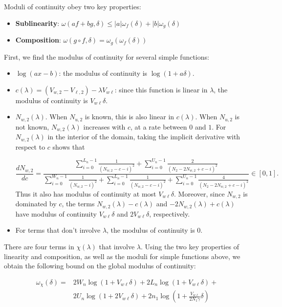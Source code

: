 \documentclass[runningheads]{llncs}
\begin{document}
Moduli of continuity obey two key properties:

\begin{itemize}
\item \textbf{Sublinearity}: $\omega(a f + b g, \delta) \le \lvert a \rvert \omega_f(\delta) + \lvert b \rvert \omega_g (\delta)$
\item \textbf{Composition}: $\omega(g \circ f, \delta) = \omega_g(\omega_f(\delta))$
\end{itemize}

\noindent First, we find the modulus of continuity for several simple functions:

\begin{itemize}
\item $\log(ax - b)$: the modulus of continuity is $\log(1 + a\delta)$.
\item $c(\lambda) = (V_{w,2}-V_{\ell,2}) - \lambda V_{w\ell}$: since this function is linear in $\lambda$, the modulus of continuity is $V_{w\ell}\delta$.
\item $N_{w,2}(\lambda)$. When $N_{u,2}$ is known, this is also linear in $c(\lambda)$. 
When $N_{u,2}$ is not known, $N_{w,2}(\lambda)$ increases with $c$, at a rate between $0$ and $1$.
For $N_{w,2}(\lambda)$ in the interior of the domain, taking the implicit derivative with respect to $c$ shows that

$$\frac{d N_{w, 2}}{dc} = \frac{ \sum_{i=0}^{L_n-1} \frac{1}{(N_{w,2} - c - i)^2} + \sum_{i=0}^{U_n-1} \frac{2}{(N_2 - 2N_{w,2} + c - i)^2} }{\sum_{i=0}^{W_n-1} \frac{1}{(N_{w,2} - i)^2} + \sum_{i=0}^{L_n-1} \frac{1}{(N_{w,2} - c - i)^2} + \sum_{i=0}^{U_n-1} \frac{4}{(N_2 - 2N_{w,2} + c - i)^2} } \in [0, 1].$$
Thus it also has modulus of continuity at most $V_{w\ell}\delta$.
Moreover, since $N_{w,2}$ is dominated by $c$, the terms $N_{w,2}(\lambda)-c(\lambda)$ and $-2N_{w,2}(\lambda)+c(\lambda)$ have modulus of continuity $V_{w\ell}\delta$ and $2V_{w\ell}\delta$, respectively.

\item For terms that don't involve $\lambda$, the modulus of continuity is 0.
\end{itemize}

There are four terms in $\chi(\lambda)$ that involve $\lambda$.
Using the two key properties of linearity and composition, as well as the moduli for simple functions above, we obtain the following bound on the global modulus of continuity:

\begin{align}
\omega_\chi(\delta) = & 2W_n \log(1 + V_{w\ell}\delta) + 2L_n \log(1+ V_{w\ell}\delta) + \nonumber \\
& 2U_n \log(1 + 2V_{w\ell}\delta) + 2n_1 \log\left(1 + \frac{V_{w\ell}}{2N_1\gamma}\delta\right)
\end{align}



\end{document}
